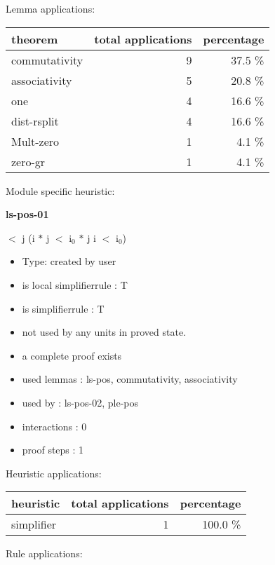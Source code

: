 \documentclass[a4paper]{article}
\begin{document}
Lemma applications:

\begin{supertabular}{l|r|r}
theorem	        & total applications & percentage \\ \hline
commutativity & 9 & 37.5 \% \\
associativity & 5 & 20.8 \% \\
one & 4 & 16.6 \% \\
dist-rsplit & 4 & 16.6 \% \\
Mult-zero & 1 & 4.1 \% \\
zero-gr & 1 & 4.1 \% \\

\end{supertabular}

Module specific heuristic:

\pagebreak

{\LARGE\bf ls-pos-01}\label{lemma-ls-pos-01}

\medskip

  $<$ j \Imp (i $*$ j $<$ $\mbox{i}_{0}$ $*$ j \Equiv i $<$ $\mbox{i}_{0}$)

\begin{itemize}

\item Type: created by user

\item is local simplifierrule : T
\item is simplifierrule : T
\item not used by any units in proved state.
\item       a complete proof exists
\item       used lemmas  : ls-pos, commutativity, associativity
\item       used by      : ls-pos-02, ple-pos
\item       interactions : 0
\item       proof steps  : 1
\end{itemize}

\medskip


Heuristic applications:

\begin{supertabular}{l|r|r}
heuristic	& total applications & percentage \\ \hline
simplifier & 1 & 100.0 \% \\

\end{supertabular}

Rule applications:
\end{document}
